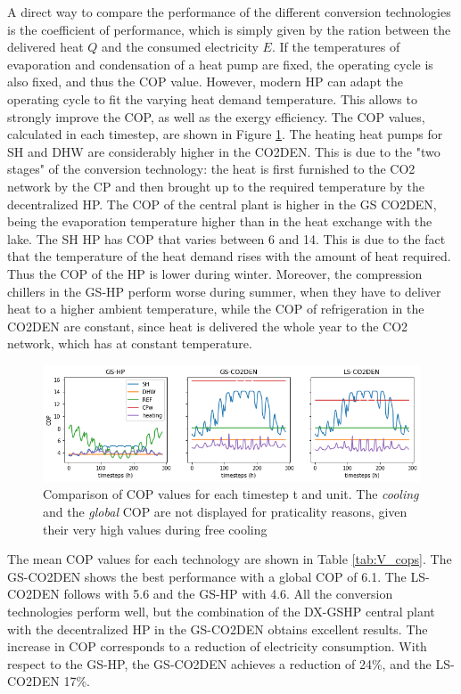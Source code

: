 \documentclass{article}
\begin{document}
A direct way to compare the performance of the different conversion technologies is the coefficient of performance, which is simply given by the ration between the delivered heat $Q$ and the consumed electricity $E$. If the temperatures of evaporation and condensation of a heat pump are fixed, the operating cycle is also fixed, and thus the COP value. However, modern HP can adapt the operating cycle to fit the varying heat demand temperature. This allows to strongly improve the COP, as well as the exergy efficiency. The COP values, calculated in each timestep, are shown in Figure \ref{fig:v_cop}. 
The heating heat pumps for SH and DHW are considerably higher in the CO2DEN. This is due to the "two stages" of the conversion technology: the heat is first furnished to the CO2 network by the CP and then brought up to the required temperature by the decentralized HP. 
The COP of the central plant is higher in the GS CO2DEN, being the evaporation temperature higher than in the heat exchange with the lake. 
The SH HP has COP that varies between 6 and 14. This is due to the fact that the temperature of the heat demand rises with the amount of heat required. Thus the COP of the HP is lower during winter.
Moreover, the compression chillers in the GS-HP perform worse during summer, when they have to deliver heat to a higher ambient temperature, while the COP of refrigeration in the CO2DEN are constant, since heat is delivered the whole year to the CO2 network, which has at constant temperature.

\begin{figure}[tph]
	\centering
	\includegraphics[width=1\linewidth]{Images/V_COP}
	\caption{Comparison of COP values for each timestep t and unit. The \textit{cooling } and the \textit{global} COP are not displayed for praticality reasons, given their very high values during free cooling}
	\label{fig:v_cop}
\end{figure}

The mean COP values for each technology are shown in Table \ref{tab:V_cops}. The GS-CO2DEN shows the best performance with a global COP of 6.1. The LS-CO2DEN follows with 5.6 and the GS-HP with 4.6. All the conversion technologies perform well, but the combination of the DX-GSHP central plant with the decentralized HP in the GS-CO2DEN obtains excellent results. The increase in COP corresponds to a reduction of electricity consumption. With respect to the GS-HP, the GS-CO2DEN achieves a reduction of 24\%, and the LS-CO2DEN 17\%.
\end{document}
